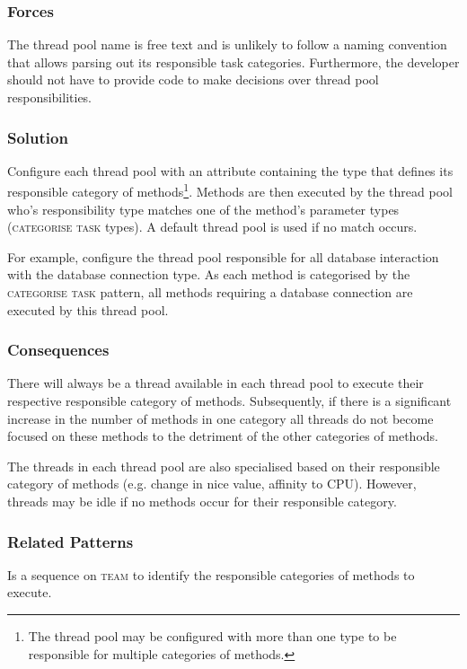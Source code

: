\documentclass[prodmode]{style/acmlarge}
\begin{document}
\subsubsection*{Forces} The thread pool name is free text and is unlikely to
follow a naming convention that allows parsing out its responsible task
categories.  Furthermore, the developer should not have to provide code to make
decisions over thread pool responsibilities.

\subsubsection*{\textbf{Solution}} Configure each thread pool with an attribute
containing the type that defines its responsible category of
methods\footnote{The thread pool may be configured with more than one type to be
responsible for multiple categories of methods.}. Methods are then executed by
the thread pool who's responsibility type matches one of the method's parameter
types (\textsc{categorise task} types).  A default thread pool is used if no
match occurs.

For example, configure the thread pool responsible for all database interaction
with the database connection type.  As each method is categorised by the
\textsc{categorise task} pattern, all methods requiring a database connection
are executed by this thread pool.

\subsubsection*{Consequences} There will always be a thread available in each
thread pool to execute their respective responsible category of methods. 
Subsequently, if there is a significant increase in the number of methods in one
category all threads do not become focused on these methods to the detriment of
the other categories of methods.

The threads in each thread pool are also specialised based on their responsible
category of methods (e.g. change in nice value, affinity to CPU).  However,
threads may be idle if no methods occur for their responsible category.

\subsubsection*{Related Patterns} Is a sequence on \textsc{team} to identify
the responsible categories of methods to execute.
\end{document}
